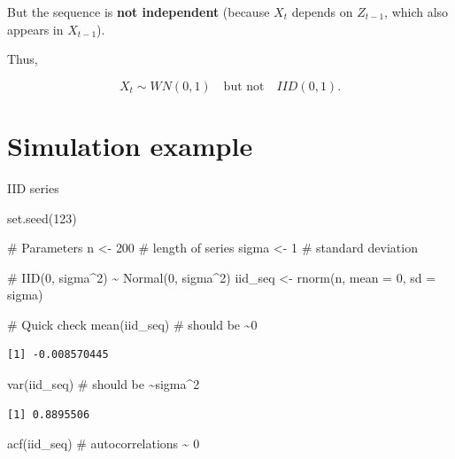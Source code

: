 \documentclass[
  11pt,
  a4paper,
]{report}
\newenvironment{Shaded}{\begin{snugshade}}{\end{snugshade}}
\newcommand{\AttributeTok}[1]{\textcolor[rgb]{0.40,0.45,0.13}{#1}}
\newcommand{\CommentTok}[1]{\textcolor[rgb]{0.37,0.37,0.37}{#1}}
\newcommand{\DecValTok}[1]{\textcolor[rgb]{0.68,0.00,0.00}{#1}}
\newcommand{\FunctionTok}[1]{\textcolor[rgb]{0.28,0.35,0.67}{#1}}
\newcommand{\NormalTok}[1]{\textcolor[rgb]{0.00,0.23,0.31}{#1}}
\newcommand{\OtherTok}[1]{\textcolor[rgb]{0.00,0.23,0.31}{#1}}
\begin{document}
But the sequence is \textbf{not independent} (because \(X_t\) depends on
\(Z_{t-1}\), which also appears in \(X_{t-1}\)).

Thus,

\[
X_t \sim WN(0,1) \quad \text{but not} \quad IID(0,1).
\]

\section{Simulation example}\label{simulation-example}

IID series

\begin{Shaded}
\begin{Highlighting}[]
\FunctionTok{set.seed}\NormalTok{(}\DecValTok{123}\NormalTok{)}

\CommentTok{\# Parameters}
\NormalTok{n }\OtherTok{\textless{}{-}} \DecValTok{200}        \CommentTok{\# length of series}
\NormalTok{sigma }\OtherTok{\textless{}{-}} \DecValTok{1}      \CommentTok{\# standard deviation}

\CommentTok{\# IID(0, sigma\^{}2) \textasciitilde{} Normal(0, sigma\^{}2)}
\NormalTok{iid\_seq }\OtherTok{\textless{}{-}} \FunctionTok{rnorm}\NormalTok{(n, }\AttributeTok{mean =} \DecValTok{0}\NormalTok{, }\AttributeTok{sd =}\NormalTok{ sigma)}

\CommentTok{\# Quick check}
\FunctionTok{mean}\NormalTok{(iid\_seq)      }\CommentTok{\# should be \textasciitilde{}0}
\end{Highlighting}
\end{Shaded}

\begin{verbatim}
[1] -0.008570445
\end{verbatim}

\begin{Shaded}
\begin{Highlighting}[]
\FunctionTok{var}\NormalTok{(iid\_seq)       }\CommentTok{\# should be \textasciitilde{}sigma\^{}2}
\end{Highlighting}
\end{Shaded}

\begin{verbatim}
[1] 0.8895506
\end{verbatim}

\begin{Shaded}
\begin{Highlighting}[]
\FunctionTok{acf}\NormalTok{(iid\_seq)       }\CommentTok{\# autocorrelations \textasciitilde{} 0}
\end{Highlighting}
\end{Shaded}
\end{document}

